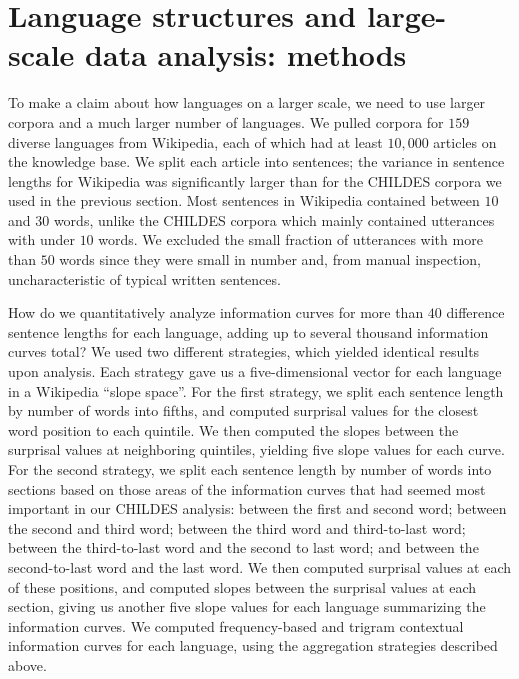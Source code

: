 \documentclass[man,floatsintext]{apa6}
\begin{document}
\hypertarget{language-structures-and-large-scale-data-analysis-methods}{%
\section{Language structures and large-scale data analysis: methods}\label{language-structures-and-large-scale-data-analysis-methods}}

To make a claim about how languages on a larger scale, we need to use larger corpora and a much larger number of languages. We pulled corpora for \(159\) diverse languages from Wikipedia, each of which had at least \(10,000\) articles on the knowledge base. We split each article into sentences; the variance in sentence lengths for Wikipedia was significantly larger than for the CHILDES corpora we used in the previous section. Most sentences in Wikipedia contained between \(10\) and \(30\) words, unlike the CHILDES corpora which mainly contained utterances with under \(10\) words. We excluded the small fraction of utterances with more than \(50\) words since they were small in number and, from manual inspection, uncharacteristic of typical written sentences.

How do we quantitatively analyze information curves for more than \(40\) difference sentence lengths for each language, adding up to several thousand information curves total? We used two different strategies, which yielded identical results upon analysis. Each strategy gave us a five-dimensional vector for each language in a Wikipedia \enquote{slope space}. For the first strategy, we split each sentence length by number of words into fifths, and computed surprisal values for the closest word position to each quintile. We then computed the slopes between the surprisal values at neighboring quintiles, yielding five slope values for each curve. For the second strategy, we split each sentence length by number of words into sections based on those areas of the information curves that had seemed most important in our CHILDES analysis: between the first and second word; between the second and third word; between the third word and third-to-last word; between the third-to-last word and the second to last word; and between the second-to-last word and the last word. We then computed surprisal values at each of these positions, and computed slopes between the surprisal values at each section, giving us another five slope values for each language summarizing the information curves. We computed frequency-based and trigram contextual information curves for each language, using the aggregation strategies described above.
\end{document}
